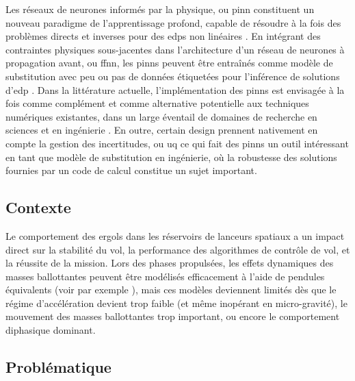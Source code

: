 \documentclass[12pt]{article}
\begin{document}
	Les réseaux de neurones informés par la physique, ou \gls{pinn} constituent un nouveau paradigme de l’apprentissage profond, capable de résoudre à la fois des problèmes directs et inverses pour des \gls{edps} non linéaires \cite{raissiPhysicsinformedNeuralNetworks2019}. En intégrant des contraintes physiques sous-jacentes dans l’architecture d’un réseau de neurones à propagation avant, ou \gls{ffnn}, les \gls{pinn}s peuvent être entraînés comme modèle de substitution avec peu ou pas de données étiquetées pour l’inférence de solutions d’\gls{edp} \cite{cuomoScientificMachineLearning2022}. Dans la littérature actuelle, l’implémentation des \gls{pinn}s est envisagée à la fois comme complément et comme alternative potentielle aux techniques numériques existantes, dans un large éventail de domaines de recherche en sciences et en ingénierie \cite{maoPhysicsinformedNeuralNetworks2020,buosoPersonalisingLeftventricularBiophysical2021, caiPhysicsInformedNeuralNetworks2021}.
	En outre, certain design prennent nativement en compte la gestion des incertitudes, ou \gls{uq} \cite{yangBPINNsBayesianPhysicsInformed2021,zhangQuantifyingTotalUncertainty2018} ce qui fait des \gls{pinn}s un outil intéressant en tant que modèle de substitution en ingénierie, où la robustesse des solutions fournies par un code de calcul constitue un sujet important.
	
	\subsection*{Contexte}
	
	
	Le comportement des ergols dans les réservoirs de lanceurs spatiaux a un impact direct sur la stabilité du vol, la performance des algorithmes de contrôle de vol, et la réussite de la mission. Lors des phases propulsées, les effets dynamiques des masses ballottantes peuvent être modélisés efficacement à l'aide de pendules équivalents (voir par exemple \cite{ibrahimLiquidSloshingDynamics2005a}), mais ces modèles deviennent limités dès que le régime d’accélération devient trop faible (et même inopérant en micro-gravité), le mouvement des masses ballottantes trop important, ou encore le comportement diphasique dominant.
	
	\subsection*{Problématique}
	
\end{document}

